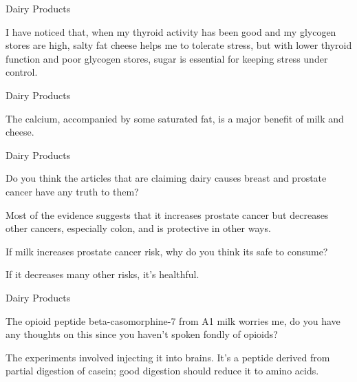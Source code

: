 \documentclass[11pt,oneside,openany,extrafontsizes]{memoir}
\begin{document}
\begin{standalonequote}{Dairy Products}

    \begin{answer}
      I have noticed that, when my thyroid activity has been good and my glycogen stores are high, salty fat cheese helps me to tolerate stress, but with lower thyroid function and poor glycogen stores, sugar is essential for keeping stress under control.
    \end{answer}
\end{standalonequote}

\begin{standalonequote}{Dairy Products}

    \begin{answer}
      The calcium, accompanied by some saturated fat, is a major benefit of milk and cheese.
    \end{answer}
\end{standalonequote}

\begin{emailexchange}{Dairy Products}

    \begin{question}
        Do you think the articles that are claiming dairy causes breast and prostate cancer have any truth to them?
    \end{question}

    \begin{answer}
      Most of the evidence suggests that it increases prostate cancer but decreases other cancers, especially colon, and is protective in other ways.
    \end{answer}

    \begin{question}
        If milk increases prostate cancer risk, why do you think its safe to consume?
    \end{question}

    \begin{answer}
       If it decreases many other risks, it's healthful.
    \end{answer}
\end{emailexchange}

\begin{qaexchange}{Dairy Products}

    \begin{question}
        The opioid peptide beta-casomorphine-7 from A1 milk worries me, do you have any thoughts on this since you haven't spoken fondly of opioids?
    \end{question}

    \begin{answer}
      The experiments involved injecting it into brains. It's a peptide derived from partial digestion of casein; good digestion should reduce it to amino acids.
    \end{answer}
\end{qaexchange}
\end{document}

